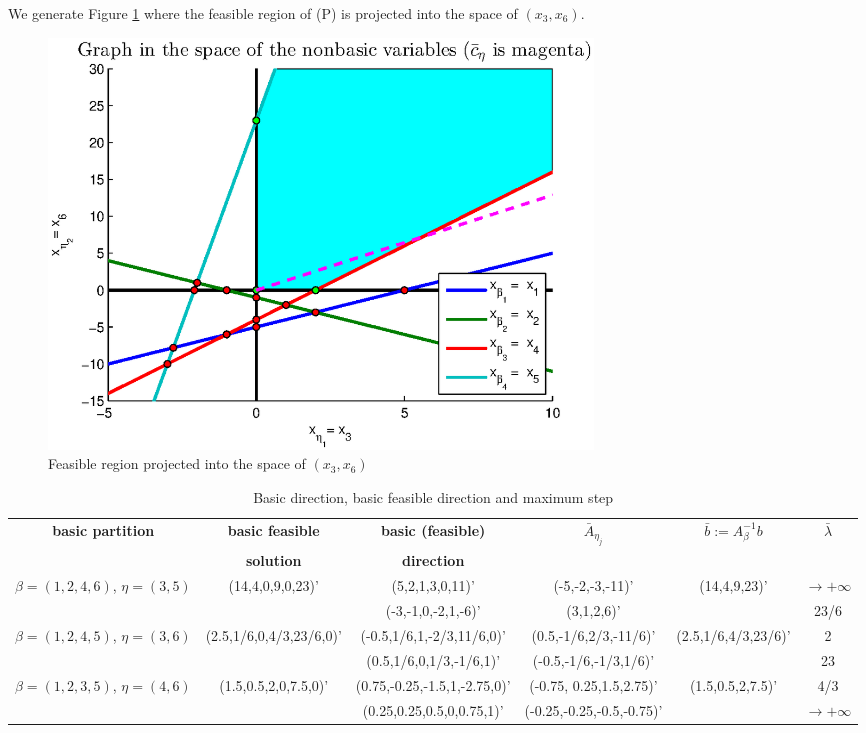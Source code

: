 We generate Figure \ref{fig:p1} where the feasible region of (P) is projected into the space of  $(x_3,x_6)$.

\begin{figure}[h!!]
\includegraphics[width=0.7\textwidth]{p1/p1.eps}
\caption{Feasible region projected into the space of $(x_3,x_6)$}\label{fig:p1}
\end{figure}

\begin{table}[!h]
\centering
\footnotesize
\begin{tabular}{|c|c|c|c|c|c|}\hline

\textbf{basic partition} & \textbf{basic feasible} & \textbf{basic (feasible)} & $\bar{A}_{\eta_j}$ & $ \bar{b} := A_{\beta}^{-1}b$ & $\bar{\lambda}$ \\
&\textbf{solution} & \textbf{direction} & & & \\
\hline
$\beta = (1,2,4,6) $, $\eta = (3,5)$&(14,4,0,9,0,23)'&(5,2,1,3,0,11)'& (-5,-2,-3,-11)' &(14,4,9,23)'&$\to+\infty$\\
&&(-3,-1,0,-2,1,-6)'& (3,1,2,6)'&&23/6\\\hline
$\beta = (1,2,4,5) $, $\eta = (3,6)$&(2.5,1/6,0,4/3,23/6,0)'&(-0.5,1/6,1,-2/3,11/6,0)'& (0.5,-1/6,2/3,-11/6)' &(2.5,1/6,4/3,23/6)'&2\\
&&(0.5,1/6,0,1/3,-1/6,1)'& (-0.5,-1/6,-1/3,1/6)' &&23\\\hline
$\beta = (1,2,3,5) $, $\eta = (4,6)$&(1.5,0.5,2,0,7.5,0)'&(0.75,-0.25,-1.5,1,-2.75,0)'& (-0.75, 0.25,1.5,2.75)' &(1.5,0.5,2,7.5)'&4/3\\
&&(0.25,0.25,0.5,0,0.75,1)'& (-0.25,-0.25,-0.5,-0.75)' &&$\to+\infty$\\\hline
\end{tabular}
\caption{Basic direction, basic feasible direction and maximum step}
\label{tab:max-step}
\end{table}

